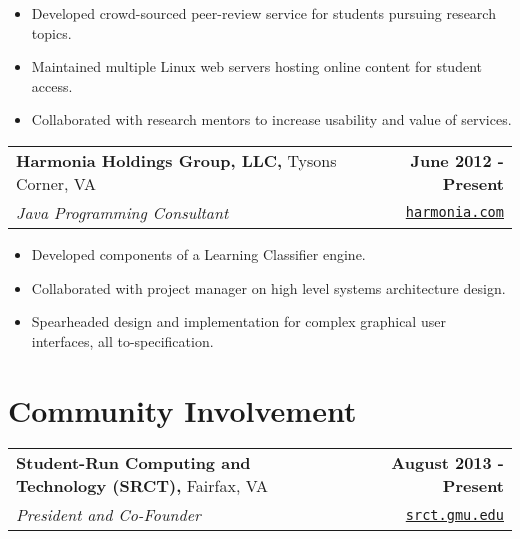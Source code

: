 \documentclass[letterpaper]{article}
\newenvironment{details}
{\begin{itemize}}
{\end{itemize}}
\begin{document}
  \begin{details}
  \item Developed crowd-sourced peer-review service for students pursuing research topics.
  \item Maintained multiple Linux web servers hosting online content for student access.
  \item Collaborated with research mentors to increase usability and value of services.
  \end{details}

  \noindent
  \begin{tabularx}{\textwidth}{@{}X r@{}}
    \textbf{Harmonia Holdings Group, LLC,} Tysons Corner, VA & \textbf{June 2012 - Present} \\
    \emph{Java Programming Consultant} & \texttt{\href{harmonia.com}{harmonia.com}}
  \end{tabularx}

  \begin{details}
  \item Developed components of a Learning Classifier engine.
  \item Collaborated with project manager on high level systems architecture design.
  \item Spearheaded design and implementation for complex graphical user interfaces, all to-specification.
  \end{details}

%


  \section{Community Involvement}
  \noindent
  \begin{tabularx}{\textwidth}{@{}X r@{}}
    \textbf{Student-Run Computing and Technology (SRCT),} Fairfax, VA & \textbf{August 2013 - Present} \\
    \emph{President and Co-Founder} & \texttt{\href{srct.gmu.edu}{srct.gmu.edu}}
  \end{tabularx}
\end{document}
